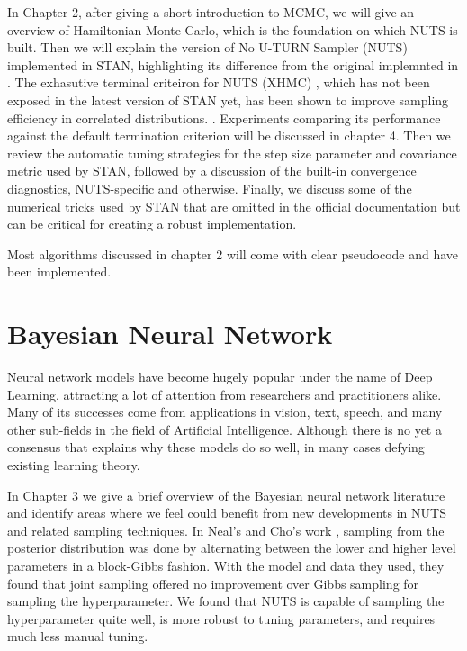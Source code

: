 \documentclass[]{report}
\begin{document}
In Chapter 2, after giving a short introduction to MCMC, we will give an overview of Hamiltonian Monte Carlo, which is the foundation on which NUTS is built. Then we will explain the version of No U-TURN Sampler (NUTS) implemented in STAN, highlighting its difference from the original implemnted in \cite{hoffman2014no}. The exhasutive terminal criteiron for NUTS (XHMC) , which has not been exposed in the latest version of STAN yet, has been shown to improve sampling efficiency in correlated distributions.  \cite{betancourt2016identifying}. Experiments comparing its performance against the default termination criterion will be discussed in chapter 4. Then we review the automatic tuning strategies for the step size parameter and covariance metric used by STAN, followed by a discussion of the built-in convergence diagnostics, NUTS-specific and otherwise.
Finally, we discuss some of the numerical tricks used by STAN that are omitted in the official documentation but can be critical for creating a robust implementation. 

Most algorithms discussed in chapter 2 will come with clear pseudocode and have been implemented. 






\section{Bayesian Neural Network }

Neural network models have become hugely popular under the name of Deep Learning, attracting a lot of attention from researchers and practitioners alike. Many of its successes come from applications in vision, text, speech, and many other sub-fields in the field of Artificial Intelligence. Although there is no yet a consensus that explains why these models do so well, in many cases defying existing learning theory. 


In Chapter 3 we give a brief overview of the Bayesian neural network literature and identify areas where we feel could benefit from new developments in NUTS and related sampling techniques. In Neal's and Cho's work \cite{neal1993bayesian,choo2000learning}, sampling from the posterior distribution was done by alternating between the lower and higher level parameters in a block-Gibbs fashion. With the model and data they used, they found that joint sampling offered no improvement over Gibbs sampling for sampling the hyperparameter. We found that NUTS is capable of sampling the hyperparameter quite well, is more robust to tuning parameters, and requires much less manual tuning. 
\end{document}
